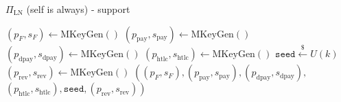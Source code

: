 \begin{protocolbox}{$\Pi_{\mathrm{LN}}$ (self is \alice{} always) - support}
\begin{algorithmic}[1]
     
      \State $\left(p_F, s_F\right) \gets \mathrm{MKeyGen}\left(\right)$
      \State $\left(p_{\mathrm{pay}}, s_{\mathrm{pay}}\right) \gets
      \mathrm{MKeyGen}\left(\right)$ 
      \State $\left(p_{\mathrm{dpay}}, s_{\mathrm{dpay}}\right) \gets
      \mathrm{MKeyGen}\left(\right)$ 
      \State $\left(p_{\mathrm{htlc}}, s_{\mathrm{htlc}}\right) \gets
      \mathrm{MKeyGen}\left(\right)$ 
      \State $\texttt{seed} \overset{\$}{\gets} U(k)$ 
      \State $\left(p_{\mathrm{rev}}, s_{\mathrm{rev}}\right) \gets
      \mathrm{MKeyGen}\left(\right)$ 
      \State \Return $\left(\left(p_F, s_F\right), \left(p_{\mathrm{pay}},
      s_{\mathrm{pay}}\right), \left(p_{\mathrm{dpay}},
      s_{\mathrm{dpay}}\right),\right.$
      \Indent
        \State $\left.\left(p_{\mathrm{htlc}}, s_{\mathrm{htlc}}\right),
        \mathtt{seed}, \left(p_{\mathrm{rev}}, s_{\mathrm{rev}}\right)\right)$
      \EndIndent
    \EndFunction
  \end{algorithmic}
\end{protocolbox}

